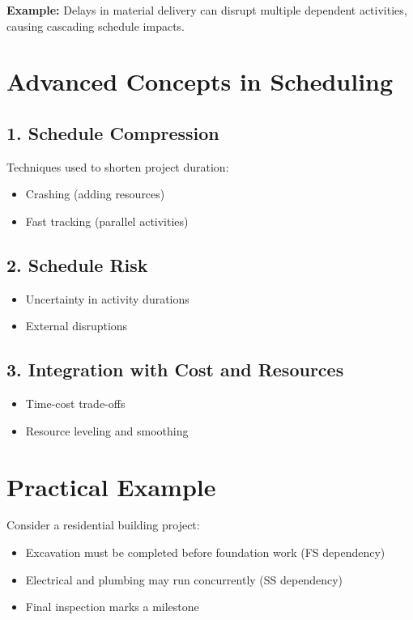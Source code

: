 \documentclass[12pt,a4paper]{article}
\begin{document}
\textbf{Example:} Delays in material delivery can disrupt multiple dependent activities, causing cascading schedule impacts.

\section*{Advanced Concepts in Scheduling}

\subsection*{1. Schedule Compression}
Techniques used to shorten project duration:
\begin{itemize}
    \item Crashing (adding resources)
    \item Fast tracking (parallel activities)
\end{itemize}

\subsection*{2. Schedule Risk}
\begin{itemize}
    \item Uncertainty in activity durations
    \item External disruptions
\end{itemize}

\subsection*{3. Integration with Cost and Resources}
\begin{itemize}
    \item Time-cost trade-offs
    \item Resource leveling and smoothing
\end{itemize}

\section*{Practical Example}
Consider a residential building project:
\begin{itemize}
    \item Excavation must be completed before foundation work (FS dependency)
    \item Electrical and plumbing may run concurrently (SS dependency)
    \item Final inspection marks a milestone
\end{itemize}
\end{document}
